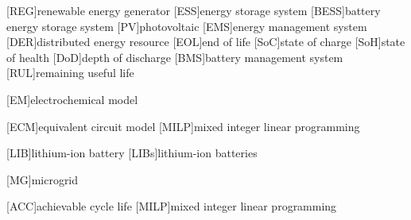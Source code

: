 \begin{acronym}
    [REG]{renewable energy generator}
    [ESS]{energy storage system}
    [BESS]{battery energy storage system}
    [PV]{photovoltaic}
    [EMS]{energy management system}
    [DER]{distributed energy resource}
    [EOL]{end of life}
    [SoC]{state of charge}
    [SoH]{state of health}
    [DoD]{depth of discharge}
    [BMS]{battery management system}
    [RUL]{remaining useful life}
    
    [EM]{electrochemical model}
    
    [ECM]{equivalent circuit model}
    [MILP]{mixed integer linear programming}

    [LIB]{lithium-ion battery}
    [LIBs]{lithium-ion batteries}

    [MG]{microgrid}
    
    [ACC]{achievable cycle life}
    [MILP]{mixed integer linear programming}
\end{acronym}